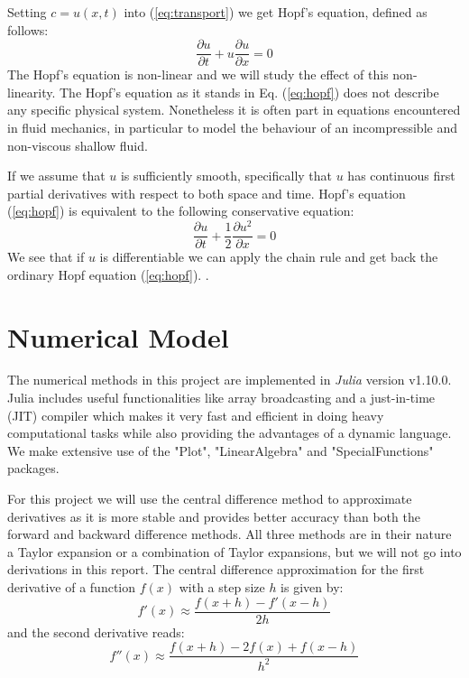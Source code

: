 \documentclass[5p,sort&compress]{elsarticle}
\numberwithin{equation}{subsection}
\begin{document}
Setting $c = u(x,t)$ into (\ref{eq:transport}) we get Hopf's equation, defined as follows:
\begin{equation}
\frac{\partial u}{\partial t} + u \frac{\partial u}{\partial x} = 0
\label{eq:hopf}
\end{equation}
The Hopf’s equation is non-linear and we will study the effect of this non-linearity. The
Hopf’s equation as it stands in Eq. (\ref{eq:hopf}) does not describe any specific physical system. Nonetheless it is often part in equations encountered in fluid mechanics, in particular to model the behaviour of an incompressible and non-viscous shallow fluid. \cite{assignment}

If we assume that $u$ is sufficiently smooth, specifically that $u$ has continuous first partial derivatives with respect to both space and time. Hopf's equation (\ref{eq:hopf}) is equivalent to the following conservative equation:
\begin{equation}
\frac{\partial u}{\partial t} + \frac{1}{2}\frac{\partial u^2}{\partial x} = 0
\label{eq:cons_hopf}
\end{equation}
We see that if $u$ is differentiable we can apply the chain rule and get back the ordinary Hopf equation (\ref{eq:hopf}). .

\section{Numerical Model}
The numerical methods in this project are implemented in \textit{Julia} version v1.10.0. Julia includes useful functionalities like array broadcasting  and a just-in-time (JIT) compiler which makes it very fast and efficient in doing heavy computational tasks while also providing the advantages of a dynamic language. We make extensive use of the "Plot", "LinearAlgebra" and "SpecialFunctions" packages.

For this project we will use the central difference method to approximate derivatives as it is more stable and provides better accuracy than both the forward and backward difference methods. All three methods are in their nature a Taylor expansion or a combination of Taylor expansions, but we will not go into derivations in this report. The central difference approximation for the first derivative of a function $f(x)$ with a step size $h$ is given by:
\begin{equation}
    f'(x) \approx \frac{f(x+h) - f'(x-h)}{2h}
    \label{eq:first_der}
\end{equation}
and the second derivative reads:
\begin{equation}
    f''(x) \approx \frac{f(x+h) -2f(x) + f(x-h)}{h^2}
    \label{eq:second_der}
\end{equation}
\end{document}
